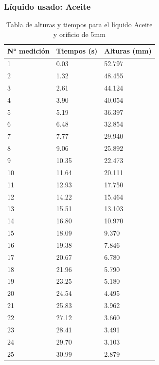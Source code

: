 \documentclass{article}
\begin{document}
\subsubsection{Líquido usado: Aceite}

\begin{table}[H]
    \begin{center}
        \begin{tabular}{ | m{2cm} | m{2cm} | m{2cm} | }
            \hline N° medición & Tiempos (s) & Alturas (mm) \\ 
            \hline 1 & 0.03 &  52.797 \\
            \hline 2 & 1.32 &  48.455 \\
            \hline 3 & 2.61 &  44.124 \\
            \hline 4 & 3.90 &  40.054 \\
            \hline 5 & 5.19 &  36.397 \\
            \hline 6 & 6.48 &  32.854 \\
            \hline 7 & 7.77 &  29.940 \\
            \hline 8 & 9.06 &  25.892 \\
            \hline 9 & 10.35 &  22.473 \\
            \hline 10 & 11.64 &  20.111 \\
            \hline 11 & 12.93 &  17.750 \\
            \hline 12 & 14.22 &  15.464 \\
            \hline 13 & 15.51 &  13.103 \\
            \hline 14 & 16.80 &  10.970 \\
            \hline 15 & 18.09 &  9.370 \\
            \hline 16 & 19.38 &  7.846 \\
            \hline 17 & 20.67 &  6.780 \\
            \hline 18 & 21.96 &  5.790 \\
            \hline 19 & 23.25 &  5.180 \\
            \hline 20 & 24.54 &  4.495 \\
            \hline 21 & 25.83 &  3.962 \\
            \hline 22 & 27.12 &  3.660 \\
            \hline 23 & 28.41 &  3.491 \\
            \hline 24 & 29.70 &  3.103 \\
            \hline 25 & 30.99 &  2.879 \\
            \hline
        \end{tabular}
    \end{center}
    \caption{Tabla de alturas y tiempos para el líquido Aceite y orificio de 5mm}
\end{table}
\end{document}

